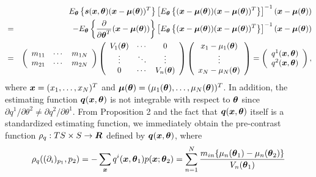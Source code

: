 \documentclass[graybox]{svmult}
\newcommand{\bm}[1]{\mbox{\boldmath $#1$}}
\newcommand{\bms}[1]{\mbox{\scriptsize\boldmath $#1$}}
\begin{document}
\begin{eqnarray*}
   &&E_{\bms{\theta}}\left\{\bm{s}(\bm{x},\bm{\theta})(\bm{x} - \bm{\mu}(\bm{\theta}))^T\right\}
     \left[E_{\bms{\theta}}\left\{(\bm{x} - \bm{\mu}(\bm{\theta}))(\bm{x} - \bm{\mu}(\bm{\theta}))^T\right\}\right]^{-1}
     (\bm{x} - \bm{\mu}(\bm{\theta})) \\
   &=&
      -E_{\bms{\theta}}\left\{\frac{\partial}{\partial\bm{\theta}^T}(\bm{x} - \bm{\mu}(\bm{\theta}))\right\}
      \left[E_{\bms{\theta}}\left\{(\bm{x} - \bm{\mu}(\bm{\theta}))(\bm{x} - \bm{\mu}(\bm{\theta}))^T\right\}\right]^{-1}
      (\bm{x} - \bm{\mu}(\bm{\theta})) \\
   &=&
      \left(\begin{array}{ccc}
               m_{11} & \cdots & m_{1N} \\
               m_{21} & \cdots & m_{2N}
            \end{array}
      \right)
      \left(\begin{array}{ccc}
               V_1(\bm{\theta}) & \cdots & 0 \\
               \vdots               & \ddots & \vdots \\
               0                       & \cdots & V_n(\bm{\theta})
            \end{array}
      \right)
      \left(\begin{array}{c}
               x_1 - \mu_1(\bm{\theta}) \\
               \vdots \\
               x_N - \mu_N(\bm{\theta})
            \end{array}
      \right)
    = \left(\begin{array}{c}
               q^1(\bm{x},\bm{\theta}) \\
               q^2(\bm{x},\bm{\theta})
            \end{array}
      \right),
\end{eqnarray*}
%
where $\bm{x}=(x_1,\ldots,x_N)^T$ and $\bm{\mu}(\bm{\theta})=(\mu_1(\bm{\theta}),\ldots,\mu_N(\bm{\theta}))^T$.
In addition, the estimating function $\bm{q}(\bm{x},\bm{\theta})$ is not integrable with respect
to $\bm{\theta}$ since $\partial q^1/\partial\theta^2 \neq \partial q^2/\partial\theta^1$.
From Proposition 2 and the fact that $\bm{q}(\bm{x},\bm{\theta})$ itself is a standardized estimating function,
we immediately obtain the pre-contrast function $\rho_q:TS \times S \rightarrow \bm{R}$
defined by $\bm{q}(\bm{x},\bm{\theta})$, where
%
\begin{eqnarray*}
   \rho_q((\partial_i)_{p_1},p_2) = -\sum_{\bms{x}}q^i(\bm{x},\bm{\theta}_1)p(\bm{x};\bm{\theta}_2)
                                  = \sum_{n=1}^{N}\frac{m_{in}\{\mu_n(\bm{\theta}_1) - \mu_n(\bm{\theta}_2)\}}
                                    {V_n(\bm{\theta}_1)}
\end{eqnarray*}
\end{document}
